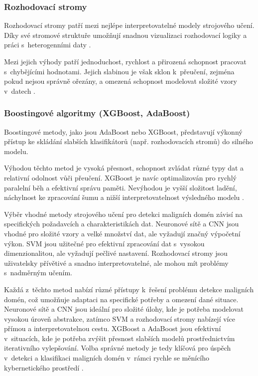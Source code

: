 \subsubsection{Rozhodovací stromy}

Rozhodovací stromy patří mezi nejlépe interpretovatelné modely strojového učení. Díky své stromové struktuře umožňují snadnou vizualizaci rozhodovací logiky a práci s~heterogenními daty \cite{quinlan1986induction}.

Mezi jejich výhody patří jednoduchost, rychlost a přirozená schopnost pracovat s~chybějícími hodnotami. Jejich slabinou je však sklon k~přeučení, zejména pokud nejsou správně ořezány, a omezená schopnost modelovat složité vzory v~datech \cite{ma2009beyondblacklists}.

\subsubsection{Boostingové algoritmy (XGBoost, AdaBoost)}

Boostingové metody, jako jsou AdaBoost nebo XGBoost, představují výkonný přístup ke skládání slabších klasifikátorů (např. rozhodovacích stromů) do silného modelu.

Výhodou těchto metod je vysoká přesnost, schopnost zvládat různé typy dat a relativní odolnost vůči přeučení. XGBoost je navíc optimalizován pro rychlý paralelní běh a efektivní správu paměti. Nevýhodou je vyšší složitost ladění, náchylnost ke zpracování šumu a nižší interpretovatelnost výsledného modelu \cite{freund1997boosting, chen2016xgboost}.

\noindent Výběr vhodné metody strojového učení pro detekci maligních domén závisí na specifických požadavcích a charakteristikách dat. Neuronové sítě a CNN jsou vhodné pro složité vzory a velké množství dat, ale vyžadují značný výpočetní výkon. SVM jsou užitečné pro efektivní zpracování dat s~vysokou dimenzionalitou, ale vyžadují pečlivé nastavení. Rozhodovací stromy jsou uživatelsky přívětivé a snadno interpretovatelné, ale mohou mít problémy s~nadměrným učením. 

Každá z~těchto metod nabízí různé přístupy k~řešení problému detekce maligních domén, což umožňuje adaptaci na specifické potřeby a omezení dané situace. Neuronové sítě a CNN jsou ideální pro složité úlohy, kde je potřeba modelovat vysokou úroveň abstrakce, zatímco SVM a rozhodovací stromy nabízejí více přímou a interpretovatelnou cestu. XGBoost a AdaBoost jsou efektivní v~situacích, kde je potřeba zvýšit přesnost slabších modelů prostřednictvím iterativního vylepšování. Volba správné metody je tedy klíčová pro úspěch v~detekci a klasifikaci maligních domén v~rámci rychle se měnícího kybernetického prostředí \cite{goodfellow2016deep, cortes1995support, chen2016xgboost}.

